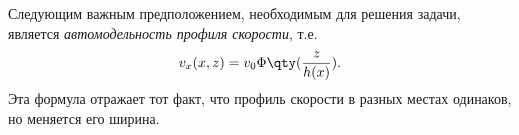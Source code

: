 


Следующим важным предположением, необходимым для решения задачи, является \textit{автомодельность профиля скорости},
т.е.
\begin{equation}
    v_x (x,z) = v_0 \Phi\qty(\frac{z}{h(x)}).
\end{equation}
Эта формула отражает тот факт, что профиль скорости в разных местах одинаков,
но меняется его ширина.

